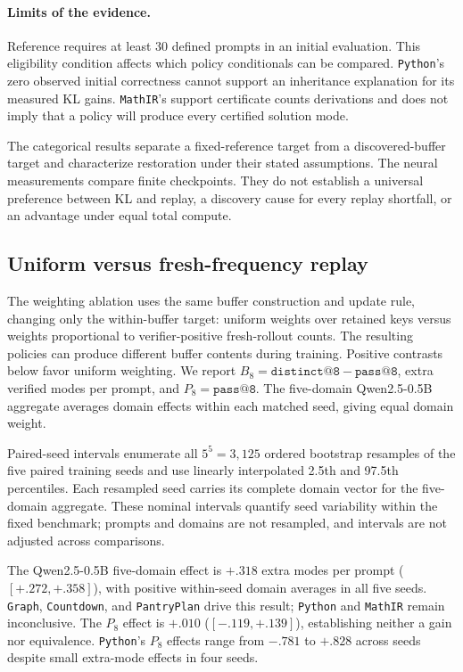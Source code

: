 \paragraph{Limits of the evidence.}
Reference \pmd{} requires at least 30 defined prompts in an initial
evaluation. This eligibility condition affects which policy conditionals
can be compared. \texttt{Python}'s zero observed initial correctness cannot
support an inheritance explanation for its measured KL gains.
\texttt{MathIR}'s support certificate counts derivations and does not imply
that a policy will produce every certified solution mode.

The categorical results separate a fixed-reference target from a
discovered-buffer target and characterize restoration under their stated
assumptions. The neural measurements compare finite checkpoints. They do
not establish a universal preference between KL and replay, a discovery
cause for every replay shortfall, or an advantage under equal total compute.

\subsection{Uniform versus fresh-frequency replay}
\label{app:frequency-replay-progress}

The weighting ablation uses the same buffer construction and update rule,
changing only the within-buffer target: uniform weights over retained keys
versus weights proportional to verifier-positive fresh-rollout counts.
The resulting policies can produce different buffer contents during training.
Positive contrasts below favor uniform weighting. We report
$B_8=\texttt{distinct@8}-\texttt{pass@8}$, extra verified modes per prompt,
and $P_8=\texttt{pass@8}$. The five-domain Qwen2.5-0.5B aggregate averages
domain effects within each matched seed, giving equal domain weight.

Paired-seed intervals enumerate all $5^5=3{,}125$ ordered bootstrap
resamples of the five paired training seeds and use linearly interpolated
2.5th and 97.5th percentiles. Each resampled seed carries its complete domain
vector for the five-domain aggregate. These nominal intervals quantify seed
variability within the fixed benchmark; prompts and domains are not resampled,
and intervals are not adjusted across comparisons.

The Qwen2.5-0.5B five-domain effect is $+.318$ extra modes per
prompt ($[+.272,+.358]$), with positive within-seed domain averages in all
five seeds. \texttt{Graph}, \texttt{Countdown}, and \texttt{PantryPlan} drive this result; \texttt{Python} and
\texttt{MathIR} remain inconclusive. The $P_8$ effect is $+.010$
($[-.119,+.139]$), establishing neither a gain nor equivalence. \texttt{Python}'s
$P_8$ effects range from $-.781$ to $+.828$ across seeds despite
small extra-mode effects in four seeds.

